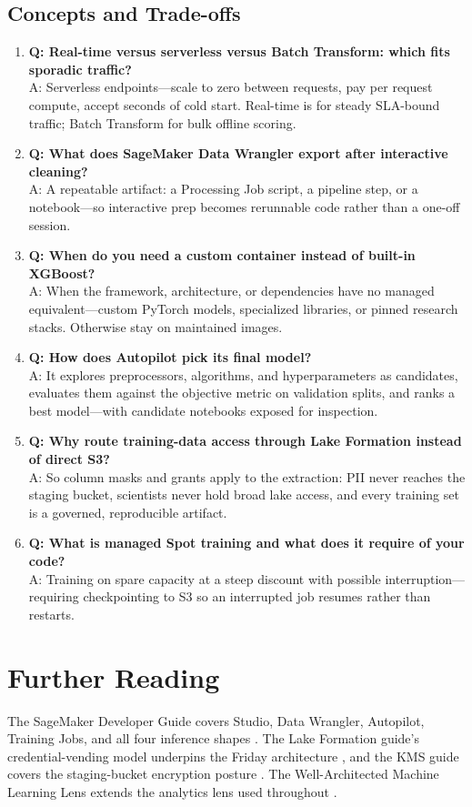 \subsection{Concepts and Trade-offs}
\begin{enumerate}
    \item \textbf{Q: Real-time versus serverless versus Batch Transform: which fits sporadic traffic?}\\
    A: Serverless endpoints---scale to zero between requests, pay per request compute, accept seconds of cold start. Real-time is for steady SLA-bound traffic; Batch Transform for bulk offline scoring.
    \item \textbf{Q: What does SageMaker Data Wrangler export after interactive cleaning?}\\
    A: A repeatable artifact: a Processing Job script, a pipeline step, or a notebook---so interactive prep becomes rerunnable code rather than a one-off session.
    \item \textbf{Q: When do you need a custom container instead of built-in XGBoost?}\\
    A: When the framework, architecture, or dependencies have no managed equivalent---custom PyTorch models, specialized libraries, or pinned research stacks. Otherwise stay on maintained images.
    \item \textbf{Q: How does Autopilot pick its final model?}\\
    A: It explores preprocessors, algorithms, and hyperparameters as candidates, evaluates them against the objective metric on validation splits, and ranks a best model---with candidate notebooks exposed for inspection.
    \item \textbf{Q: Why route training-data access through Lake Formation instead of direct S3?}\\
    A: So column masks and grants apply to the extraction: PII never reaches the staging bucket, scientists never hold broad lake access, and every training set is a governed, reproducible artifact.
    \item \textbf{Q: What is managed Spot training and what does it require of your code?}\\
    A: Training on spare capacity at a steep discount with possible interruption---requiring checkpointing to S3 so an interrupted job resumes rather than restarts.
\end{enumerate}

\section{Further Reading}
The SageMaker Developer Guide covers Studio, Data Wrangler, Autopilot, Training Jobs, and all four inference shapes \cite{awsSageMakerDocs}. The Lake Formation guide's credential-vending model underpins the Friday architecture \cite{awsLakeFormationDocs}, and the KMS guide covers the staging-bucket encryption posture \cite{awsKMSDocs}. The Well-Architected Machine Learning Lens extends the analytics lens used throughout \cite{awsWellArchitectedAnalytics}.

